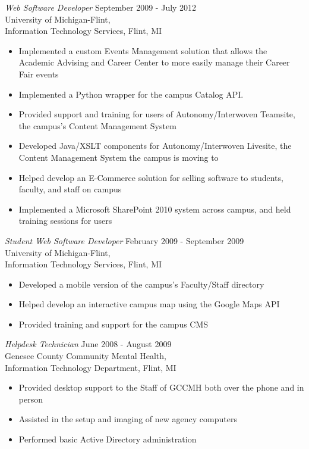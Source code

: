 \documentclass[line,margin]{res}
\begin{document}
\begin{resume}
    {\sl Web Software Developer }
            \hfill September 2009 - July 2012 \\
                   University of Michigan-Flint, \\
                   Information Technology Services, Flint, MI
        \begin{itemize}
            \item Implemented a custom Events Management solution that
                  allows the Academic Advising and Career Center to
                  more easily manage their Career Fair events
			\item Implemented a Python wrapper for the campus Catalog API.
            \item Provided support and training for users of Autonomy/Interwoven
                  Teamsite, the campus's Content Management System
            \item Developed Java/XSLT components for Autonomy/Interwoven Livesite, the
                  Content Management System the campus is moving to
            \item Helped develop an E-Commerce solution for selling software
                  to students, faculty, and staff on campus
            \item Implemented a Microsoft SharePoint 2010 system across
                  campus, and held training sessions for users \\
        \end{itemize}

    {\sl Student Web Software Developer }
            \hfill February 2009 - September 2009 \\
                   University of Michigan-Flint, \\
                   Information Technology Services, Flint, MI
        \begin{itemize}
            \item Developed a mobile version of the campus's Faculty/Staff
                  directory
            \item Helped develop an interactive campus map using the
                  Google Maps API
            \item Provided training and support for the campus CMS
        \end{itemize}

\newpage

    {\sl Helpdesk Technician}
            \hfill June 2008 - August 2009 \\
                   Genesee County Community Mental Health, \\
                   Information Technology Department, Flint, MI
        \begin{itemize}
            \item Provided desktop support to the Staff of GCCMH both
                  over the phone and in person
            \item Assisted in the setup and imaging of new agency
                  computers
            \item Performed basic Active Directory administration
        \end{itemize}



\end{resume}
\end{document}
